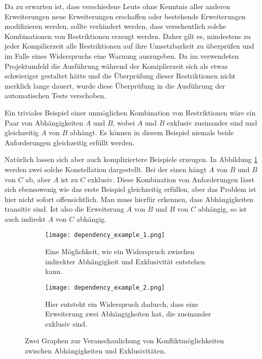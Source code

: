 Da zu erwarten ist, dass verschiedene Leute ohne Kenntnis aller anderen Erweiterungen neue Erweiterungen erschaffen oder bestehende Erweiterungen modifizieren werden, sollte verhindert werden, dass versehentlich solche Kombinationen von Restriktionen erzeugt werden. Daher gilt es, mindestens zu jeder Kompilierzeit alle Restriktionen auf ihre Umsetzbarkeit zu überprüfen und im Falle eines Widerspruchs eine Warnung auszugeben. Da im verwendeten Projektumfeld die Ausführung während der Komiplierzeit sich als etwas schwieriger gestaltet hätte und die Überprüfung dieser Restriktionen nicht merklich lange dauert, wurde diese Überprüfung in die Ausführung der automatischen Tests verschoben.

Ein triviales Beispiel einer unmöglichen Kombination von Restriktionen wäre ein Paar von Abhängigkeiten $A$ und $B$, wobei $A$ und $B$ exklusiv zueinander sind und gleichzeitig $A$ von $B$ abhängt. Es können in diesem Beispiel niemals beide Anforderungen gleichzeitig erfüllt werden.

Natürlich lassen sich aber auch kompliziertere Beispiele erzeugen. In Abbildung \ref{fig:impl:dependency_conflict_examples} werden zwei solche Konstellation dargestellt. Bei der einen hängt $A$ von $B$ und $B$ von $C$ ab, aber $A$ ist zu $C$ exklusiv. Diese Kombination von Anforderungen lässt sich ebensowenig wie das erste Beispiel gleichzeitig erfüllen, aber das Problem ist hier nicht sofort offensichtlich. Man muss hierfür erkennen, dass Abhängigkeiten transitiv sind. Ist also die Erweiterung $A$ von $B$ und $B$ von $C$ abhängig, so ist auch indirekt $A$ von $C$ abhängig.

  \begin{figure}
		\centering
		\begin{subfigure}[a]{0.4\linewidth}
			\texttt{[image: dependency\_example\_1.png]}
      		\caption{Eine Möglichkeit, wie ein Widerspruch zwischen indirekter Abhängigkeit und Exklusivität entstehen kann.}
		\end{subfigure}
		\begin{subfigure}[a]{0.4\linewidth}
			\texttt{[image: dependency\_example\_2.png]}
      		\caption{Hier entsteht ein Widerspruch dadurch, dass eine Erweiterung zwei Abhängigkeiten hat, die zueinander exklusiv sind.}
		\end{subfigure}
		\caption{Zwei Graphen zur Veranschaulichung von Konfliktmöglichkeiten zwischen Abhängigkeiten und Exklusivitäten.}
		\label{fig:impl:dependency_conflict_examples}
  \end{figure}


